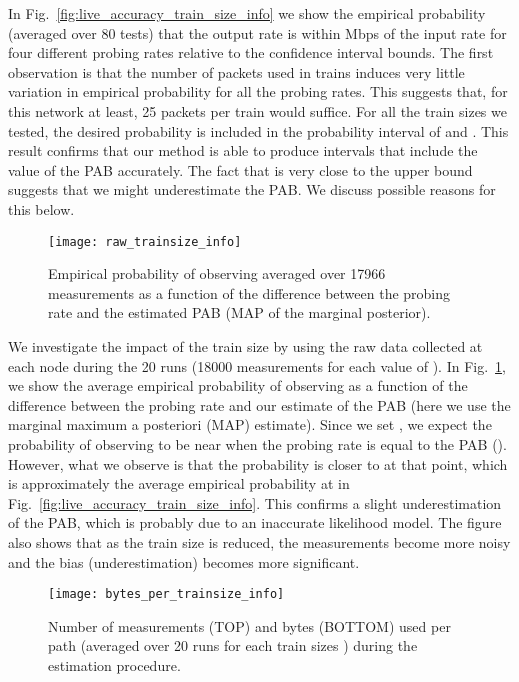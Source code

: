 \documentclass[final,5p,times,twocolumn]{elsarticle}
\begin{document}
In Fig.~\ref{fig:live_accuracy_train_size_info} we show the empirical probability (averaged over 80 tests) that the output rate is within  Mbps of the input rate for four different probing rates relative to the confidence interval bounds.  The first observation is that the number of packets used in trains induces very little variation in empirical probability for all the probing rates.  This suggests that, for this network at least, 25 packets per train would suffice.  For all the train sizes we tested, the desired probability  is included in the probability interval of  and .  This result confirms that our method is able to produce intervals that include the value of the PAB accurately.  The fact that  is very close to the upper bound suggests that we might underestimate the PAB.  We discuss possible reasons for this below.

\begin{figure}[!h]
	\centering
	\texttt{[image: raw\_trainsize\_info]}
	\caption{Empirical probability of observing  averaged over 17966 measurements as a function of the difference between the probing rate and the estimated PAB (MAP of the marginal posterior).\label{fig:raw_trainsize_info}}
\end{figure}	

We investigate the impact of the train size by using the raw data collected at each node during the 20 runs (18000 measurements for each value of ).  In Fig.~\ref{fig:raw_trainsize_info}, we show the average empirical probability of observing  as a function of the difference between the probing rate and our estimate of the PAB (here we use the marginal maximum a posteriori (MAP) estimate).  Since we set , we expect the probability of observing  to be near  when the probing rate is equal to the PAB ().  However, what we observe is that the probability is closer to  at that point, which is approximately the average empirical probability at  in Fig.~\ref{fig:live_accuracy_train_size_info}.  This confirms a slight underestimation of the PAB, which is probably due to an inaccurate likelihood model.  The figure also shows that as the train size is reduced, the measurements become more noisy and the bias (underestimation) becomes more significant.  

\begin{figure}[!h]
	\centering
	\texttt{[image: bytes\_per\_trainsize\_info]}
	\caption{Number of measurements (TOP) and bytes (BOTTOM) used per path (averaged over 20 runs for each train sizes ) during the estimation procedure.  \label{fig:bytes_per_trainsize_info}}
\end{figure}
\end{document}

